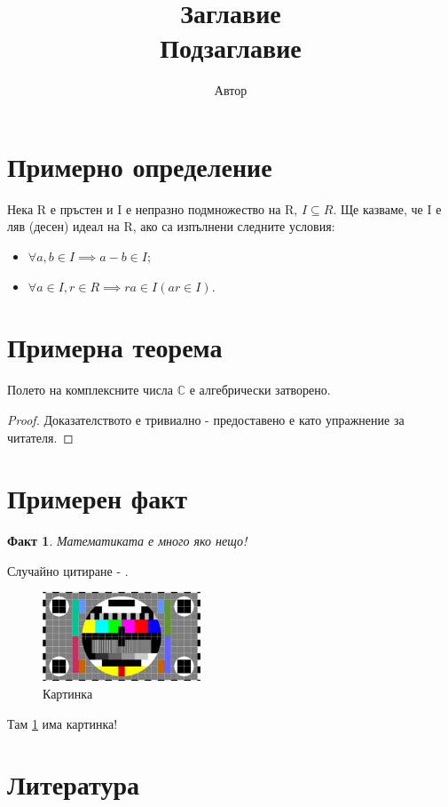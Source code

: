 \documentclass{article}
\title{\textbf{Заглавие}\\ \Large{Подзаглавие}}
\author{Автор}
\newtheorem*{fact}{Факт}
\begin{document}
\maketitle
\tableofcontents
\newpage

\section{Примерно определение}

\begin{definition}
Нека R е пръстен и I е непразно подмножество на R, $I \subseteq R$. Ще казваме,
че I е ляв (десен) идеал на R, ако са изпълнени следните условия:
\begin{itemize}
	\item $\forall a, b \in I \implies a - b \in I$;
	\item $\forall a \in I, r \in R \implies ra \in I (ar \in I)$.
\end{itemize}
\end{definition}

\section{Примерна теорема}

\begin{theorem}[Даламбер] \label{dalamber}
	Полето на комплексните числа $\mathbb{C}$ е алгебрически затворено.
\end{theorem}

\begin{proof}
	Доказателството е тривиално - предоставено е като упражнение за читателя.
\end{proof}

\section{Примерен факт}

\begin{fact}
	Математиката е много яко нещо!
\end{fact}

\par Случайно цитиране - \autocite{reed1960}.

\begin{figure}
\begin{center}
\includegraphics[height=100px]{test-image.jpg}
\caption{Картинка}
\label{fig:test-image}
\end{center}
\end{figure}

\par Там \ref{fig:test-image} има картинка!

\section{Литература}
\nocite{*}
\printbibliography[heading=none]
\end{document}
